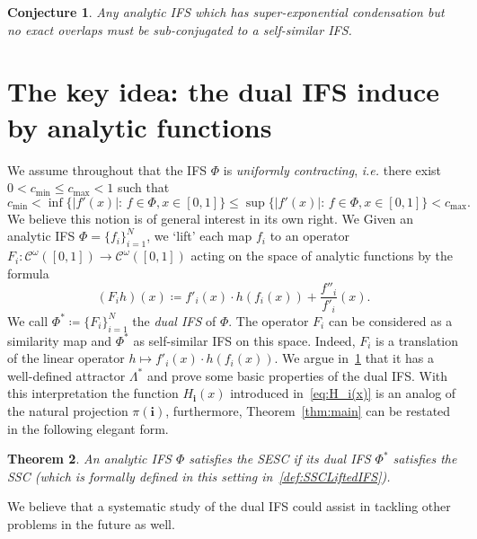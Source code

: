 \documentclass[12pt,]{article}
\def\cref#1{\ref{#1}}%
\newtheorem{theorem}{Theorem}[section]
\newtheorem{conjecture}[theorem]{Conjecture}
\theoremstyle{definition}
\theoremstyle{remark}
\newcommand{\0}{\mathbf{0}}
\newcommand{\ie}{{\it i.e.}\/ }
\newcommand{\bi}{\mathbf{i}}
\begin{document}
{\begin{conjecture}
Any analytic IFS which has super-exponential condensation but no exact overlaps must be
sub-conjugated to a self-similar IFS.
\end{conjecture}






\section{The key idea: the dual IFS induce by analytic functions}\label{sec:DualIFSFull}
We assume throughout that the IFS $\Phi$ is \emph{uniformly contracting}, \ie there exist
$0<c_{\min} \leq c_{\max}<1$ such that 
\[
  c_{\min} < \inf\big\{ |f'(x)|:\, f\in\Phi, x\in[0,1] \big\} \leq \sup\big\{ |f'(x)|:\, f\in\Phi,
  x\in[0,1] \big\} < c_{\max}.
\]
We
believe this notion is of general interest in its own right.
We
Given an analytic IFS $\Phi=\{f_i\}_{i=1}^N$, we `lift' each map $f_i$ to an operator $F_i:
\mathcal{C}^{\omega}([0,1]) \to \mathcal{C}^{\omega}([0,1])$ acting on the space of analytic
functions by the formula
\begin{equation*}
	(F_i h)(x)\coloneqq f'_i(x)\cdot h(f_i(x)) + \frac{f''_i}{f'_i}(x).
\end{equation*}
We call $\Phi^*\coloneqq\{F_i\}_{i=1}^N$ the \emph{dual IFS} of $\Phi$. The operator $F_i$ can be
considered as a similarity map and $\Phi^*$ as self-similar IFS on this space. Indeed, $F_i$ is a
translation of the linear operator $h\mapsto f'_i(x)\cdot h(f_i(x))$. We argue
in~\cref{sec:DualIFSFull} that it has a well-defined attractor $\Lambda^*$ and prove some basic
properties of the dual IFS. With this interpretation the function $H_{\bi}(x)$ introduced
in~\cref{eq:H_i(x)} is an analog of the natural projection $\pi(\bi)$, furthermore,
Theorem~\ref{thm:main} can be restated in the following elegant form.
\begin{theorem}\label{thm:DualSSC}
An analytic IFS $\Phi$ satisfies the SESC if its dual IFS $\Phi^*$ satisfies the SSC (which is
formally defined in this setting in~\cref{def:SSCLiftedIFS}).
\end{theorem}
We believe that a systematic study of the dual IFS could assist in tackling other problems in the future as well.


}
\end{document}
